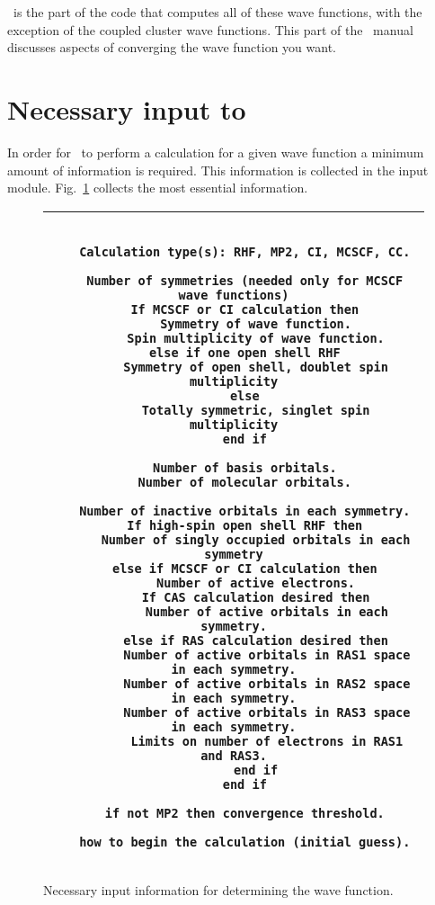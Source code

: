 \sirius\ is the part of the code that computes all of these
wave functions, with the exception of the coupled cluster wave functions.
This part of the \dalton\ manual discusses aspects of converging the
wave function you want.

\section{\label{sec:ig_necinp} Necessary input to \sirius}

In order for \dalton\ to perform a calculation for a given wave function a
minimum amount of
information is required. This information is collected in the
 input module. Fig.~\ref{fig-nec.inp.} collects the most
essential information.

\begin{figure}
    \newlength{\mpwidth}
    \settowidth{\mpwidth}{\tt M}
    \addtolength{\mpwidth}{65\mpwidth}
\begin{tabular}{|c|}
\hline
\begin{minipage}{\mpwidth}
\begin{verbatim}

   Calculation type(s): RHF, MP2, CI, MCSCF, CC.

   Number of symmetries (needed only for MCSCF wave functions)
   If MCSCF or CI calculation then
      Symmetry of wave function.
      Spin multiplicity of wave function.
   else if one open shell RHF
      Symmetry of open shell, doublet spin multiplicity
   else
      Totally symmetric, singlet spin multiplicity
   end if

   Number of basis orbitals.
   Number of molecular orbitals.

   Number of inactive orbitals in each symmetry.
   If high-spin open shell RHF then
      Number of singly occupied orbitals in each symmetry
   else if MCSCF or CI calculation then
      Number of active electrons.
      If CAS calculation desired then
         Number of active orbitals in each symmetry.
      else if RAS calculation desired then
         Number of active orbitals in RAS1 space in each symmetry.
         Number of active orbitals in RAS2 space in each symmetry.
         Number of active orbitals in RAS3 space in each symmetry.
         Limits on number of electrons in RAS1 and RAS3.
      end if
   end if

   if not MP2 then convergence threshold.

   how to begin the calculation (initial guess).

\end{verbatim}
\end{minipage} \\ \hline
\end{tabular}
\vspace{0.5cm}
\caption{Necessary input information for determining the wave
function.}\label{fig-nec.inp.}
\end{figure}


